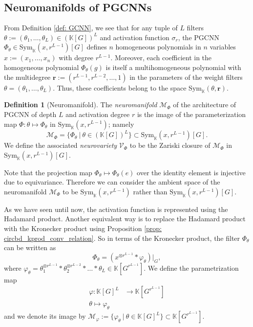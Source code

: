\documentclass[final]{article}
\newcommand{\K}{\mathbb{K}}
\newcommand{\Sym}{\text{Sym}}
\newcommand{\conv}{\ast}
\theoremstyle{definition}
\newtheorem{definition}{Definition}[section] %
\theoremstyle{plain}
\begin{document}
\subsection{Neuromanifolds of PGCNNs}
From Definition \ref{def: GCNN}, we  see that for any tuple of $L$ filters $\theta:=(\theta_1, \dots, \theta_{L}) \in (\K[G])^L$ and  activation function $\sigma_r$, the  PGCNN $\Phi_\theta \in \Sym_\K(x, r^{L-1})[G]$ defines $n$ homogeneous polynomials in $n$ variables $x:=(x_1, \dots, x_{n})$ with degree $r^{L-1}$. Moreover, each coefficient in the homogeneous polynomial $\Phi_\theta(g)$ is itself a multihomogeneous polynomial with the multidegree $\mathbf{r} := (r^{L-1}, r^{L-2}, \dots, 1)$ in the parameters of the weight filters $\theta = (\theta_1, \dots, \theta_{L})$. Thus, these coefficients belong to the space $\Sym_\K(\theta, \mathbf{r})$. 

\begin{definition}[Neuromanifold]
    The \emph{neuromanifold} $\mathcal{M}_\Phi$ of the architecture of PGCNN of depth $L$ and activation degree $r$ is the image of the parameterization map $\Phi: \theta \mapsto \Phi_\theta$ in $\Sym_\K(x, r^{L-1})$; namely
    \[
    \mathcal{M}_\Phi = \{\Phi_\theta\ |\ \theta \in (\K[G])^L\} \subset \Sym_\K(x, r^{L-1})[G].
    \]
    We define the associated \emph{neurovariety} $\mathcal{V}_\Phi$ to be the Zariski closure of $\mathcal{M}_\Phi$ in $\Sym_\K(x, r^{L-1})[G]$.
\end{definition}

Note that the projection map $\Phi_\theta \mapsto \Phi_\theta(e
)$ over the identity element is injective due to equivariance. Therefore we can consider the ambient space of the neuromanifold $\mathcal{M}_\Phi$ to be $\Sym_\K(x, r^{L-1})$ rather than $\Sym_\K(x, r^{L-1})[G]$.



As we have seen until now, the activation function is represented using the Hadamard product. 
Another equivalent way is to replace the Hadamard product with the Kronecker product using Proposition \ref{prop: circbd_kprod_conv_relation}.
So in terms of the Kronecker product, the filter $\Phi_\theta$ can be written as
\[
\Phi_\theta = (x^{\otimes r^{L-1}} \conv \varphi_\theta)|_G,
\]
where $\varphi_\theta = \theta_1^{\otimes r^{L-1}} \conv \theta_2^{\otimes r^{L-2}} \conv \dots \conv \theta_{L} \in \K[G^{r^{L-1}}]$.  We define the parametrization map 
\begin{align*}
    \varphi: \K[G]^L &\to \K[G^{r^{L-1}}]\\
    \theta \mapsto \varphi_\theta
\end{align*} 
and we denote its image by $\mathcal{M}_\varphi := \{\varphi_\theta\ |\ \theta \in \K[G]^L\} \subset \K[G^{r^{L-1}}]$.
\end{document}
